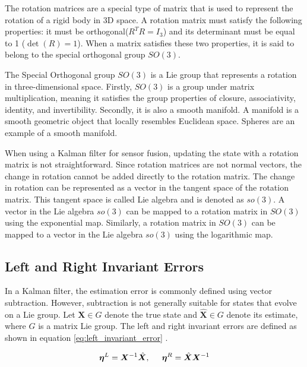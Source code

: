 \documentclass[report.tex]{subfiles}
\begin{document}
    The rotation matrices are a special type of matrix that is used to represent the rotation of a rigid body in 3D space. A rotation matrix must satisfy the following properties: it must be orthogonal($R^T R = \textit{I}_3$) and its determinant must be equal to 1 ($\det(R) = 1$). When a matrix satisfies these two properties, it is said to belong to the special orthogonal group $SO(3)$. 

    The Special Orthogonal group $SO(3)$ is a Lie group that represents a rotation in three-dimensional space. Firstly, $SO(3)$ is a group under matrix multiplication, meaning it satisfies the group properties of closure, associativity, identity, and invertibility. Secondly, it is also a smooth manifold. A manifold is a smooth geometric object that locally resembles Euclidean space. Spheres are an example of a smooth manifold. 

    When using a Kalman filter for sensor fusion, updating the state with a rotation matrix is not straightforward. Since rotation matrices are not normal vectors, the change in rotation cannot be added directly to the rotation matrix. The change in rotation can be represented as a vector in the tangent space of the rotation matrix. This tangent space is called Lie algebra and is denoted as $so(3)$. A vector in the Lie algebra $so(3)$ can be mapped to a rotation matrix in $SO(3)$ using the exponential map. Similarly, a rotation matrix in $SO(3)$ can be mapped to a vector in the Lie algebra $so(3)$ using the logarithmic map. 
        
\subsection{Left and Right Invariant Errors}
\label{subsec:background_invariant_errors}

    In a Kalman filter, the estimation error is commonly defined using vector subtraction. However, subtraction is not generally suitable for states that evolve on a Lie group. Let $\boldsymbol{X}\in G$ denote the true state and $\hat{\boldsymbol{X}}\in G$ denote its estimate, where $G$ is a matrix Lie group. The left and right invariant errors are defined as shown in equation \ref{eq:left_invariant_error} \cite{barrauInvariantExtendedKalman2017}.

    \begin{equation}
        \boldsymbol{\eta}^{L}
        =
        \boldsymbol{X}^{-1}\hat{\boldsymbol{X}},
        \hspace{0.5cm}
        \boldsymbol{\eta}^{R}
        =
        \hat{\boldsymbol{X}}\boldsymbol{X}^{-1}
        \label{eq:left_invariant_error}
    \end{equation}
\end{document}

